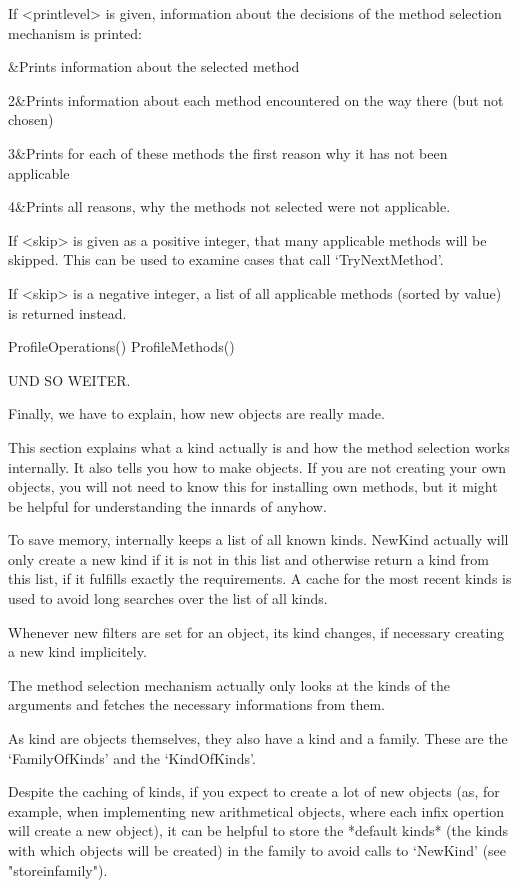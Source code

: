 If <printlevel> is given, information about
the decisions of the method selection mechanism is printed:

&Prints information about the selected method

2&Prints information about each method encountered on the way there (but not
chosen)

3&Prints for each of these methods the first reason why it has not been
applicable

4&Prints all reasons, why the methods not selected were not applicable.
\enditems

If <skip> is given as a positive integer, that many applicable  methods will
be skipped. This can be used to examine cases that call `TryNextMethod'.

If <skip> is a negative integer, a list of all applicable methods (sorted by
value) is returned instead.

\>ProfileOperations()
\>ProfileMethods()

UND SO WEITER.



Finally, we have to explain, how new objects are really made.

This section explains what a kind actually is and how the method selection
works internally. It also tells you how to make objects.
If you are not creating your own objects, you will not need to know this
for installing own methods, but it might be helpful for understanding the
innards of {\GAP} anyhow.


\danger
To save memory,
{\GAP} internally keeps a list of all known kinds. NewKind actually will
only create a new kind if it is not in this list and otherwise return a
kind from
this list, if it fulfills exactly the requirements. A cache for the most
recent kinds is used to avoid long searches over the list of all kinds.

Whenever new filters are set for an object, its kind changes, if necessary
creating a new kind implicitely.

The method selection mechanism actually only looks at the kinds of the
arguments and fetches the necessary informations from them.

\danger
As kind are objects themselves, they also have a kind and a family.
These are the `FamilyOfKinds' and the `KindOfKinds'.

\danger
Despite the caching of kinds, if you expect to create a lot of
new objects (as, for example, when implementing new arithmetical objects,
where each infix opertion will create a new object), it can be helpful to
store the *default kinds* (the kinds with which objects will be
created) in the family to avoid calls to `NewKind' (see "storeinfamily").


